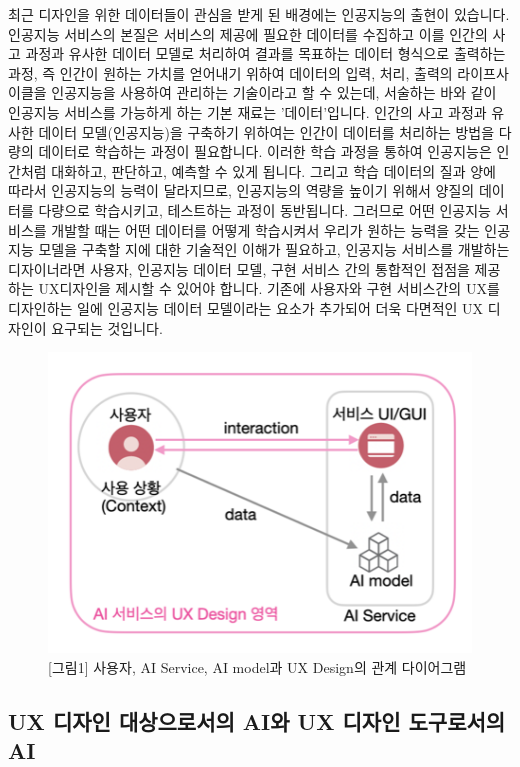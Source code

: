 \documentclass[
  letterpaper,
]{book}
\begin{document}
최근 디자인을 위한 데이터들이 관심을 받게 된 배경에는 인공지능의 출현이
있습니다. 인공지능 서비스의 본질은 서비스의 제공에 필요한 데이터를
수집하고 이를 인간의 사고 과정과 유사한 데이터 모델로 처리하여 결과를
목표하는 데이터 형식으로 출력하는 과정, 즉 인간이 원하는 가치를 얻어내기
위하여 데이터의 입력, 처리, 출력의 라이프사이클을 인공지능을 사용하여
관리하는 기술이라고 할 수 있는데, 서술하는 바와 같이 인공지능 서비스를
가능하게 하는 기본 재료는 '데이터'입니다. 인간의 사고 과정과 유사한
데이터 모델(인공지능)을 구축하기 위하여는 인간이 데이터를 처리하는
방법을 다량의 데이터로 학습하는 과정이 필요합니다. 이러한 학습 과정을
통하여 인공지능은 인간처럼 대화하고, 판단하고, 예측할 수 있게 됩니다.
그리고 학습 데이터의 질과 양에 따라서 인공지능의 능력이 달라지므로,
인공지능의 역량을 높이기 위해서 양질의 데이터를 다량으로 학습시키고,
테스트하는 과정이 동반됩니다. 그러므로 어떤 인공지능 서비스를 개발할
때는 어떤 데이터를 어떻게 학습시켜서 우리가 원하는 능력을 갖는 인공지능
모델을 구축할 지에 대한 기술적인 이해가 필요하고, 인공지능 서비스를
개발하는 디자이너라면 사용자, 인공지능 데이터 모델, 구현 서비스 간의
통합적인 접점을 제공하는 UX디자인을 제시할 수 있어야 합니다. 기존에
사용자와 구현 서비스간의 UX를 디자인하는 일에 인공지능 데이터 모델이라는
요소가 추가되어 더욱 다면적인 UX 디자인이 요구되는 것입니다.

\begin{figure}[H]

{\centering \includegraphics{img/fig1.png}

}

\caption{{[}그림1{]} 사용자, AI Service, AI model과 UX Design의 관계
다이어그램}

\end{figure}%

\subsection{UX 디자인 대상으로서의 AI와 UX 디자인 도구로서의
AI}\label{ux-uxb514uxc790uxc778-uxb300uxc0c1uxc73cuxb85cuxc11cuxc758-aiuxc640-ux-uxb514uxc790uxc778-uxb3c4uxad6cuxb85cuxc11cuxc758-ai}
\end{document}
